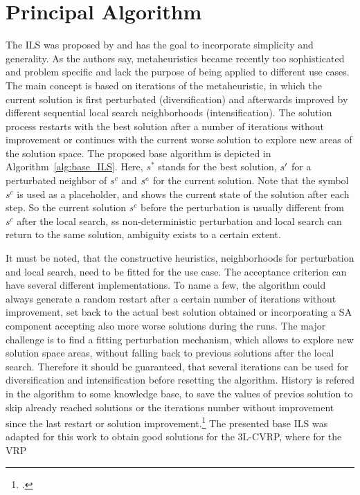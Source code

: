 \section{Principal Algorithm}
\label{sec:algorithm}
The \gls{ILS} was proposed by \cite{lourenco_iterated_2003} and has the goal to incorporate simplicity and generality.
As the authors say, metaheuristics became recently too sophisticated and problem specific and lack the purpose of
being applied to different use cases. The main concept is based on iterations of the metaheuristic, in which the current
solution is first perturbated (diversification) and afterwards improved by different sequential local search neighborhoods
(intensification). The solution process restarts with the best solution after a number of iterations without improvement
or continues with the current worse solution to explore new areas of the solution space.
The proposed base algorithm is depicted in Algorithm~\ref{alg:base_ILS}. Here, $s^*$ stands for the best solution, $s\sp{\prime}$
for a perturbated neighbor of $s^c$ and $s\sp{c}$ for the current solution. Note that the symbol $s^c$
is used as a placeholder, and shows the current state of the solution after each step. So the current solution
$s^c$ before the perturbation is usually different from $s^c$ after the local search, ss non-deterministic
perturbation and local search can return to the same solution, ambiguity exists to a certain extent.

It must be noted, that the constructive heuristics, neighborhoods for perturbation and local search, need to be fitted for
the use case. The acceptance criterion can have several different implementations. To name a few, the algorithm could always
generate a random restart after a certain number of iterations without improvement, set back to the actual best solution
obtained or incorporating a \gls{SA} component accepting also more worse solutions during the runs. The major challenge is
to find a fitting perturbation mechanism, which allows to explore new solution space areas, without falling back to previous solutions
after the local search. Therefore it should be guaranteed, that several iterations can be used for diversification and
intensification before resetting the algorithm. History is refered in the algorithm to some knowledge base,
to save the values of previos solution to skip already reached solutions or the iterations number without improvement since the
last restart or solution improvement.\footcite[cf.][]{lourenco_iterated_2003}
\parbreak
The presented base \gls{ILS} was adapted for this work to obtain good solutions for the \gls{3L-CVRP}, where for the \gls{VRP}
